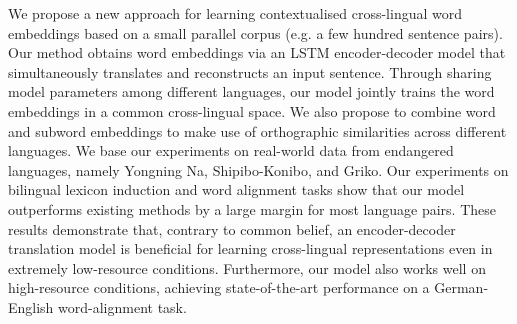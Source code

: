 We propose a new approach for learning contextualised cross-lingual word embeddings based on a small parallel corpus (e.g. a few hundred sentence pairs). Our method obtains word embeddings via an LSTM encoder-decoder model that simultaneously translates and reconstructs an input sentence. Through sharing model parameters among different languages, our model jointly trains the word embeddings in a common cross-lingual space. We also propose to combine word and subword embeddings to make use of orthographic similarities across different languages. We base our experiments on real-world data from endangered languages, namely Yongning Na, Shipibo-Konibo, and Griko. Our experiments on bilingual lexicon induction and word alignment tasks show that our model outperforms existing methods by a large margin for most language pairs. These results demonstrate that, contrary to common belief, an encoder-decoder translation model is beneficial for learning cross-lingual representations even in extremely low-resource conditions. Furthermore, our model also works well on high-resource conditions, achieving state-of-the-art performance on a German-English word-alignment task.
